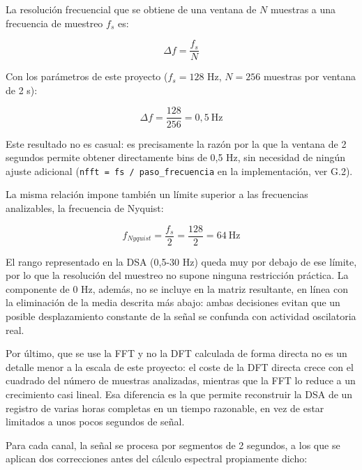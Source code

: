 \documentclass[
  spanish,
  a4paper,
  12pt,
  twoside]{memoir}
\begin{document}
La resolución frecuencial que se obtiene de una ventana de \(N\)
muestras a una frecuencia de muestreo \(f_s\) es:

\[\Delta f = \frac{f_s}{N}\]

Con los parámetros de este proyecto (\(f_s = 128\) Hz, \(N = 256\)
muestras por ventana de 2 s):

\[\Delta f = \frac{128}{256} = 0{,}5\ \text{Hz}\]

Este resultado no es casual: es precisamente la razón por la que la
ventana de 2 segundos permite obtener directamente bins de 0,5 Hz, sin
necesidad de ningún ajuste adicional
(\texttt{nfft\ =\ fs\ /\ paso\_frecuencia} en la implementación, ver
G.2).

La misma relación impone también un límite superior a las frecuencias
analizables, la frecuencia de Nyquist:

\[f_{Nyquist} = \frac{f_s}{2} = \frac{128}{2} = 64\ \text{Hz}\]

El rango representado en la DSA (0,5-30 Hz) queda muy por debajo de ese
límite, por lo que la resolución del muestreo no supone ninguna
restricción práctica. La componente de 0 Hz, además, no se incluye en la
matriz resultante, en línea con la eliminación de la media descrita más
abajo: ambas decisiones evitan que un posible desplazamiento constante
de la señal se confunda con actividad oscilatoria real.

Por último, que se use la FFT y no la DFT calculada de forma directa no
es un detalle menor a la escala de este proyecto: el coste de la DFT
directa crece con el cuadrado del número de muestras analizadas,
mientras que la FFT lo reduce a un crecimiento casi lineal. Esa
diferencia es la que permite reconstruir la DSA de un registro de varias
horas completas en un tiempo razonable, en vez de estar limitados a unos
pocos segundos de señal.

Para cada canal, la señal se procesa por segmentos de 2 segundos, a los
que se aplican dos correcciones antes del cálculo espectral propiamente
dicho:
\end{document}
